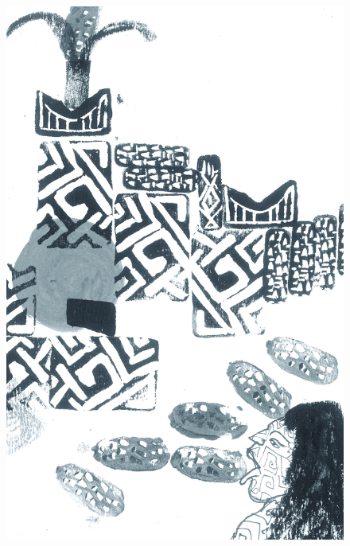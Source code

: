 \pagebreak
\thispagestyle{empty}
\begin{figure}
\vspace*{-1.6cm}
\hspace*{-2.2cm}\includegraphics[width=138mm]{./imgs/img4.jpg}
\end{figure}

\chapter*{}

\mbox{}\vspace*{\fill}


